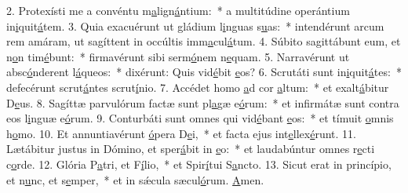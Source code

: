 2. Protexísti me a convéntu m\uline{a}lign\uline{á}ntium:~* a multitúdine operántium in\uline{i}quit\uline{á}tem.
3. Quia exacuérunt ut gládium l\uline{i}nguas s\uline{u}as:~* intendérunt arcum rem amáram, ut sagíttent in occúltis imm\uline{a}cul\uline{á}tum.
4. Súbito sagittábunt eum, et n\uline{o}n tim\uline{é}bunt:~* firmavérunt sibi serm\uline{ó}nem n\uline{e}quam.
5. Narravérunt ut absc\uline{ó}nderent l\uline{á}queos:~* dixérunt: Quis vid\uline{é}bit \uline{e}os?
6. Scrutáti sunt in\uline{i}quit\uline{á}tes:~* defecérunt scrut\uline{á}ntes scrut\uline{í}nio.
7. Accédet homo \uline{a}d cor \uline{a}ltum:~* et exalt\uline{á}bitur D\uline{e}us.
8. Sagíttæ parvulórum factæ sunt pl\uline{a}gæ e\uline{ó}rum:~* et infirmátæ sunt contra eos l\uline{i}nguæ e\uline{ó}rum.
9. Conturbáti sunt omnes qui vid\uline{é}bant \uline{e}os:~* et tímuit \uline{o}mnis h\uline{o}mo.
10. Et annuntiavérunt \uline{ó}pera D\uline{e}i,~* et facta ejus int\uline{e}llex\uline{é}runt.
11. Lætábitur justus in Dómino, et sper\uline{á}bit in \uline{e}o:~* et laudabúntur omnes r\uline{e}cti c\uline{o}rde.
12. Glória P\uline{a}tri, et F\uline{í}lio,~* et Spir\uline{í}tui S\uline{a}ncto.
13. Sicut erat in princípio, et n\uline{u}nc, et s\uline{e}mper,~* et in sǽcula sæcul\uline{ó}rum. \uline{A}men.
